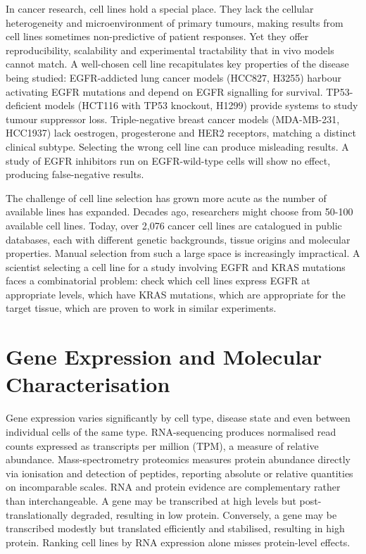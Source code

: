 \documentclass[author={Karen Coutinho, Ishaan Bhalla, Aman Raj, Dixit Kaloorani Malarmannan},
                supervisor={Dr. Daniel D'Andrea},
                degree={MSc},
                title={CellSelector Omics: A Multi-Omics Recommendation System for Cell Line Selection},
                subtitle={},
                type={},
                year={2026}]{dissertation}
\begin{document}
In cancer research, cell lines hold a special place. They lack the cellular heterogeneity and microenvironment of primary tumours, making results from cell lines sometimes non-predictive of patient responses. Yet they offer reproducibility, scalability and experimental tractability that in vivo models cannot match. A well-chosen cell line recapitulates key properties of the disease being studied: EGFR-addicted lung cancer models (HCC827, H3255) harbour activating EGFR mutations and depend on EGFR signalling for survival. TP53-deficient models (HCT116 with TP53 knockout, H1299) provide systems to study tumour suppressor loss. Triple-negative breast cancer models (MDA-MB-231, HCC1937) lack oestrogen, progesterone and HER2 receptors, matching a distinct clinical subtype. Selecting the wrong cell line can produce misleading results. A study of EGFR inhibitors run on EGFR-wild-type cells will show no effect, producing false-negative results.

The challenge of cell line selection has grown more acute as the number of available lines has expanded. Decades ago, researchers might choose from 50-100 available cell lines. Today, over 2,076 cancer cell lines are catalogued in public databases, each with different genetic backgrounds, tissue origins and molecular properties. Manual selection from such a large space is increasingly impractical. A scientist selecting a cell line for a study involving EGFR and KRAS mutations faces a combinatorial problem: check which cell lines express EGFR at appropriate levels, which have KRAS mutations, which are appropriate for the target tissue, which are proven to work in similar experiments.

\section{Gene Expression and Molecular Characterisation}

Gene expression varies significantly by cell type, disease state and even between individual cells of the same type. RNA-sequencing produces normalised read counts expressed as transcripts per million (TPM), a measure of relative abundance. Mass-spectrometry proteomics measures protein abundance directly via ionisation and detection of peptides, reporting absolute or relative quantities on incomparable scales. RNA and protein evidence are complementary rather than interchangeable. A gene may be transcribed at high levels but post-translationally degraded, resulting in low protein. Conversely, a gene may be transcribed modestly but translated efficiently and stabilised, resulting in high protein. Ranking cell lines by RNA expression alone misses protein-level effects.
\end{document}
